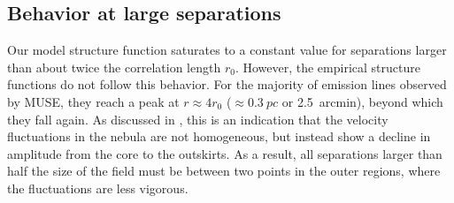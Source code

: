 \documentclass[fleqn,usenatbib, useAMS, a4paper]{mnras}
\newcommand\pos{\ensuremath{_{\mathrm{pos}}}}
\newcommand\ha{\ensuremath{\text{H}\upalpha}}
\newcommand\Wav[1]{\ensuremath{\lambda #1}}
\newcommand\halpha{\ha}
\newcommand\n{[\ion{N}{II}] \Wav{6584}}
\newcommand\oiii{[\ion{O}{III}] \Wav{5007}}
\newcommand\sii{[\ion{S}{II}] \Wav{6731}}
\begin{document}




\subsection{Behavior at large separations}
\label{sec:behavior-at-large}

Our model structure function saturates to a constant value for separations larger than about
twice the correlation length \(r_0\).
However, the empirical structure functions do not follow this behavior.
For the majority of emission lines observed by MUSE,
they reach a peak at \(r \approx 4 r_0\)
(\(\approx \qty{0.3}{pc}\) or \qty{2.5}{arcmin}),
beyond which they fall again.
As discussed in \citet[][Sec.~3.2.3 and Fig.~4b]{garciav23},
this is an indication that the velocity fluctuations in the nebula are not homogeneous,
but instead show a decline in amplitude from the core to the outskirts.
As a result, all separations larger than half the size of the field must be between
two points in the outer regions, where the fluctuations are less vigorous.
\end{document}
